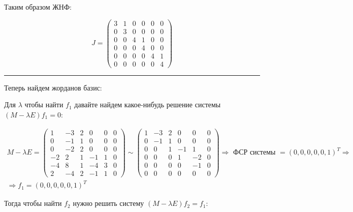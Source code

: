 \documentclass[11pt]{article}
\begin{document}
Таким образом ЖНФ:

$$
J =
\begin{pmatrix}
3 & 1 & 0 & 0 & 0 & 0 \\
0 & 3 & 0 & 0 & 0 & 0 \\
0 & 0 & 4 & 1 & 0 & 0 \\
0 & 0 & 0 & 4 & 0 & 0 \\
0 & 0 & 0 & 0 & 4 & 1 \\
0 & 0 & 0 & 0 & 0 & 4
\end{pmatrix}
$$

\noindent\rule{\textwidth}{0.5pt}

Теперь найдем жорданов базис:

Для $\lambda$ чтобы найти $f_1$ давайте найдем какое-нибудь решение системы $(M - \lambda E)f_1 = 0$:

$$
\begin{gathered}
M - \lambda E =
\begin{pmatrix}
1 & -3 & 2 & 0 & 0 & 0 \\
0 & -1 & 1 & 0 & 0 & 0 \\
0 & -2 & 2 & 0 & 0 & 0 \\
-2 & 2 & 1 & -1 & 1 & 0 \\
-4 & 8 & 1 & -4 & 3 & 0 \\
2 & -4 & 2 & -1 & 1 & 0
\end{pmatrix} \sim
\begin{pmatrix}
1 & -3 & 2 & 0 & 0 & 0 \\
0 & -1 & 1 & 0 & 0 & 0 \\
0 & 0 & 1 & -1 & 1 & 0 \\
0 & 0 & 0 & 1 & -2 & 0 \\
0 & 0 & 0 & 0 & -1 & 0 \\
0 & 0 & 0 & 0 & 0 & 0
\end{pmatrix} \Rightarrow \text{ ФСР системы } = (0, 0, 0, 0, 0, 1)^T \Rightarrow \\[6pt] \Rightarrow f_1 = (0, 0, 0, 0, 0, 1)^T
\end{gathered}
$$

Тогда чтобы найти $f_2$ нужно решить систему $(M - \lambda E)f_2 = f_1$:
\end{document}
